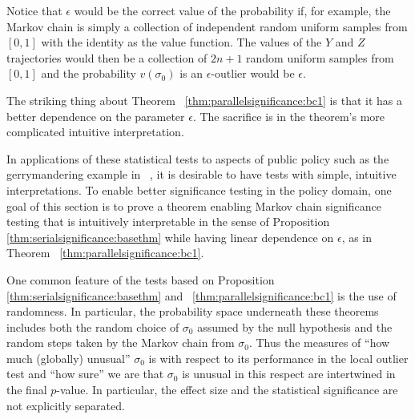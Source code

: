 \documentclass[12pt]{article}
\begin{document}

\begin{remark}
    Notice that \( \epsilon \) would be the correct value of the
    probability if, for example, the Markov chain is simply a collection
    of independent random uniform samples from \( [0,1] \) with the
    identity as the value function.  The values of the \( Y \) and \( Z \)
    trajectories would then be a collection of \( 2n + 1 \) random
    uniform samples from \( [0,1] \) and the probability \( v(\sigma_0) \)
    is an \( \epsilon \)-outlier would be \( \epsilon \).

    The striking thing about Theorem~%
    \ref{thm:parallelsignificance:bc1} is that it has a better
    dependence on the parameter \( \epsilon \).  The sacrifice is in the
    theorem's more complicated intuitive interpretation.

    In applications of these statistical tests to aspects of public
    policy such as the gerrymandering example in~%
    \cite{doi:10.1080/2330443X.2020.1806763}, it is desirable to have
    tests with simple, intuitive interpretations.  To enable better
    significance testing in the policy domain, one goal of this section
    is to prove a theorem enabling Markov chain significance testing
    that is intuitively interpretable in the sense of Proposition~%
    \ref{thm:serialsignificance:basethm} while having linear dependence
    on \( \epsilon \), as in Theorem~%
    \ref{thm:parallelsignificance:bc1}.
\end{remark}

\begin{remark}
    One common feature of the tests based on Proposition~%
    \ref{thm:serialsignificance:basethm} and~%
    \ref{thm:parallelsignificance:bc1} is the use of randomness.  In
    particular, the probability space underneath these theorems includes
    both the random choice of \( \sigma_0 \) assumed by the null
    hypothesis and the random steps taken by the Markov chain from \(
    \sigma_0 \).  Thus the measures of ``how much (globally) unusual'' \(
    \sigma_0 \) is with respect to its performance in the local outlier
    test and ``how sure'' we are that \( \sigma_0 \) is unusual in this
    respect are intertwined in the final \( p \)-value.  In particular,
    the effect size and the statistical significance are not explicitly
    separated.
\end{remark}
\end{document}
